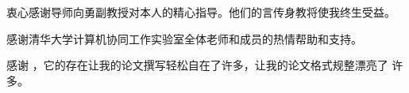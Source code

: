 \begin{acknowledgement}
  衷心感谢导师向勇副教授对本人的精心指导。他们的言传身教将使我终生受益。

  感谢清华大学计算机协同工作实验室全体老师和成员的热情帮助和支持。	
  
  感谢 \thuthesis，它的存在让我的论文撰写轻松自在了许多，让我的论文格式规整漂亮了
  许多。
\end{acknowledgement}
